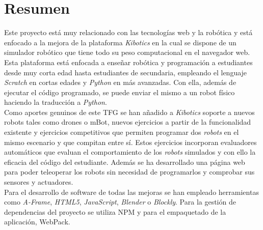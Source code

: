 \chapter*{Resumen}

     Este proyecto está muy relacionado con las tecnologías web y la robótica y está enfocado a la mejora de la plataforma \emph{Kibotics} en la cual se dispone de un simulador robótico que tiene todo su peso computacional en el navegador web. Esta plataforma está enfocada a enseñar robótica y programación a estudiantes desde muy corta edad hasta estudiantes de secundaria, empleando el lenguaje \emph{Scratch} en cortas edades y \emph{Python} en más avanzadas. Con ella, además de ejecutar el código programado, se puede enviar el mismo a un robot físico haciendo la traducción a \emph{Python}. \\
    
    
    Como aportes genuinos de este TFG se han añadido a \textit{Kibotics} soporte a nuevos robots tales como drones o mBot, nuevos ejercicios a partir de la funcionalidad existente y ejercicios competitivos que permiten programar dos \textit{robots} en el mismo escenario y que compitan entre sí. Estos ejercicios incorporan evaluadores automáticos que evaluan el comportamiento de los \textit{robots} simulados y con ello la eficacia del código del estudiante. Además se ha desarrollado una página web para poder teleoperar los robots sin necesidad de programarlos y comprobar sus sensores y actuadores. \\
    
    
    Para el desarrollo de software de todas las mejoras se han empleado herramientas como \textit{A-Frame}, \textit{HTML5}, \textit{JavaScript}, \textit{Blender} o \textit{Blockly}. Para la gestión de dependencias del proyecto se utiliza NPM y para el empaquetado de la aplicación, WebPack.